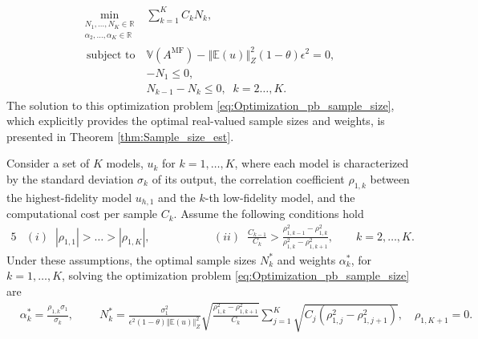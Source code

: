 %
\begin{equation}\label{eq:Optimization_pb_sample_size}
    \begin{array}{ll}
    \min \limits_{\begin{array}{c}\scriptstyle N_1,\ldots, N_K\in \mathbb{R} \\[-4pt]
\scriptstyle \alpha_2,\ldots,\alpha_K\in \mathbb{R}
\end{array}} &\displaystyle\sum\limits_{k=1}^K C_kN_k,\\
       \;\,\text{subject to} &\mathbb{V}\left(A^{\text{MF}}\right)- \left\Vert\mathbb{E}(u) \right\Vert_{Z}^2(1-\theta)\epsilon^2 = 0,\\[2pt]
       &\displaystyle -N_1\le 0,\\
        &\displaystyle N_{k-1}-N_k\le 0, \;\; k=2\ldots,K.
    \end{array}
\end{equation}
%
The solution to this optimization problem \eqref{eq:Optimization_pb_sample_size}, which explicitly provides the optimal real-valued sample sizes and weights, is presented in Theorem \ref{thm:Sample_size_est}.
%
\begin{theorem}
\label{thm:Sample_size_est}
Consider a set of $K$ models, $u_k$ for $k=1,\ldots,K$, where each model is characterized by the standard deviation $\sigma_k$ of its output, the correlation coefficient $\rho_{1,k}$ between the highest-fidelity model $u_{h,1}$ and the $k$-th low-fidelity model, and the computational cost per sample $C_k$. Assume the following conditions hold
%
\begin{alignat*}{5}
    &(i)\;\; |\rho_{1,1}|>\ldots>|\rho_{1,K}|,& \qquad \qquad
    &(ii)\;\; \frac{C_{k-1}}{C_k}>\frac{\rho_{1,k-1}^2-\rho_{1,k}^2}{\rho_{1,k}^2-\rho_{1,k+1}^2},\quad \quad k=2,\ldots,K.
\end{alignat*}
%
Under these assumptions, the optimal sample sizes $N_k^*$ and weights $\alpha_k^*$, for $k=1,\ldots, K$, solving the optimization problem \eqref{eq:Optimization_pb_sample_size} are
%
\begin{align}
    \label{eq:MFMC_SampleSize}
    &\alpha_k^*=\frac{\rho_{1,k}\sigma_1}{\sigma_k},\qquad \;N_k^*=\frac{\sigma_1^2}{\epsilon^2(1-\theta)\left\Vert\mathbb{E}(u) \right\Vert_{Z}^2}\sqrt{\frac{\rho_{1,k}^2-\rho_{1,k+1}^2}{C_k}}\sum_{j=1}^K\sqrt{C_j\left(\rho_{1,j}^2-\rho_{1,j+1}^2\right)}, \quad \rho_{1,K+1}=0.
\end{align}
%
\end{theorem}
%

